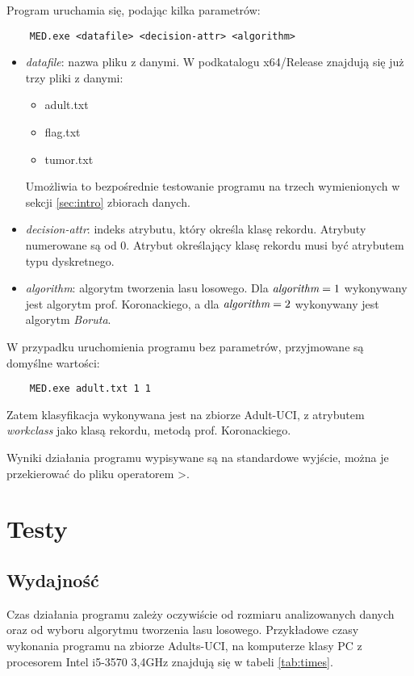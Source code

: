 \documentclass{article}
\begin{document}
Program uruchamia się, podając kilka parametrów:

\begin{lstlisting}
	MED.exe <datafile> <decision-attr> <algorithm>
\end{lstlisting}

\begin{itemize}
	\item \emph{datafile}: nazwa pliku z danymi. W podkatalogu x64/Release znajdują się już trzy pliki z danymi: 
	\begin{itemize}
		\item adult.txt
		\item flag.txt
		\item tumor.txt
	\end{itemize}
	Umożliwia to bezpośrednie testowanie programu na trzech wymienionych w sekcji \ref{sec:intro} zbiorach danych. 
	\item \emph{decision-attr}: indeks atrybutu, który określa klasę rekordu. Atrybuty numerowane są od 0. Atrybut określający klasę rekordu musi być atrybutem typu dyskretnego. 
	\item \emph{algorithm}: algorytm tworzenia lasu losowego. Dla $\emph{algorithm} = 1$ wykonywany jest algorytm prof. Koronackiego, a dla $\emph{algorithm} = 2$ wykonywany jest algorytm \emph{Boruta}. 
\end{itemize}

W przypadku uruchomienia programu bez parametrów, przyjmowane są domyślne wartości:

\begin{lstlisting}
	MED.exe adult.txt 1 1
\end{lstlisting}

Zatem klasyfikacja wykonywana jest na zbiorze Adult-UCI, z atrybutem \emph{workclass} jako klasą rekordu, metodą prof. Koronackiego. 

Wyniki działania programu wypisywane są na standardowe wyjście, można je przekierować do pliku operatorem >. 

\section{Testy}

\subsection{Wydajność}

Czas działania programu zależy oczywiście od rozmiaru analizowanych danych oraz od wyboru algorytmu tworzenia lasu losowego. Przykładowe czasy wykonania programu na zbiorze Adults-UCI, na komputerze klasy PC z procesorem Intel i5-3570 3,4GHz znajdują się w tabeli \ref{tab:times}. 
\end{document}
